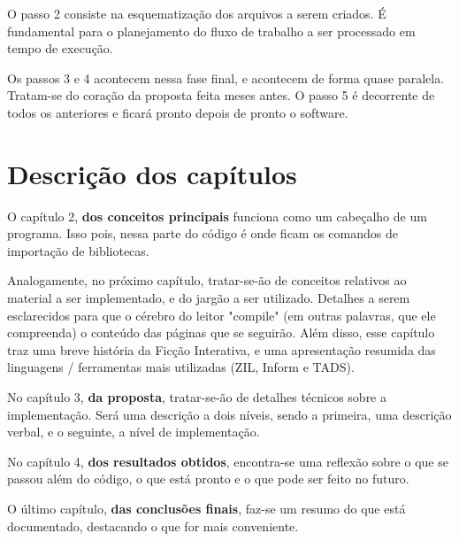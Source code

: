 O passo 2 consiste na esquematização dos arquivos a serem criados. É fundamental
para o planejamento do fluxo de trabalho a ser processado em tempo de execução.

Os passos 3 e 4 acontecem nessa fase final, e acontecem de forma quase paralela.
Tratam-se do coração da proposta feita meses antes. O passo 5 é decorrente de
todos os anteriores e ficará pronto depois de pronto o software.

\section{Descrição dos capítulos}
\label{sec:description}

O capítulo 2, \textbf{dos conceitos principais} funciona como um cabeçalho de um
programa. Isso pois, nessa parte do código é onde ficam os comandos de
importação de bibliotecas.

Analogamente, no próximo capítulo, tratar-se-ão de conceitos relativos ao
material a ser implementado, e do jargão a ser utilizado. Detalhes a serem
esclarecidos para que o cérebro do leitor "compile" (em outras palavras,
que ele compreenda) o conteúdo das páginas que se seguirão. Além disso, esse
capítulo traz uma breve história da Ficção Interativa, e uma apresentação
resumida das linguagens / ferramentas mais utilizadas (ZIL, Inform e TADS).

No capítulo 3, \textbf{da proposta}, tratar-se-ão de detalhes técnicos sobre a
implementação. Será uma descrição a dois níveis, sendo a primeira, uma descrição
verbal, e o seguinte, a nível de implementação.

No capítulo 4, \textbf{dos resultados obtidos}, encontra-se uma reflexão sobre o
que se passou além do código, o que está pronto e o que pode ser feito no futuro.

O último capítulo, \textbf{das conclusões finais}, faz-se um resumo do que está
documentado, destacando o que for mais conveniente.
